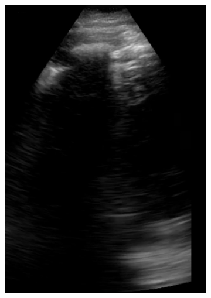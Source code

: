 \documentclass[11pt]{article} %
\begin{document}
	\begin{figure}[h]
	\centering
	\begin{subfigure}{0.3\textwidth}
	\includegraphics[width=\textwidth]{figuras/spleen.jpg}
	\caption{}
	\end{subfigure}
	\begin{subfigure}{0.3\textwidth}

\end{subfigure}
\end{figure}
\end{document}

